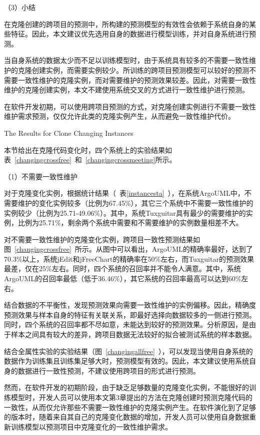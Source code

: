 （3）小结

在克隆创建的跨项目的预测中，所构建的预测模型的有效性会依赖于系统自身的某些特征。因此，本文建议优先选用自身的数据进行模型训练，并对自身系统进行预测。

当自身系统的数据太少而不足以训练模型时，由于系统具有较多的不需要一致性维护的克隆创建实例，而需要实例较少。所训练的跨项目预测模型可以较好的预测不需要一致性维护的克隆实例，而对需要维护的预测效果较差。因此，对需要一致性维护的克隆创建实例，本文不建使用系统交叉的方式进行一致性维护进行预测。

在软件开发初期，可以使用跨项目预测的方式，对克隆创建实例进行不需要一致性维护需求预测，仅仅允许此类的克隆实例产生，从而避免一致性维护代价。

{The Results for Clone Changing Instances}

本节给出在克隆代码变化时，四个系统上的实验结果如表~\ref{changingcrossfree}~和~\ref{changingcrossmeeting}所示。


（1）不需要一致性维护

对于克隆变化实例，根据统计结果（~表\ref{instancesta}~），在系统ArgoUML中，不需要维护的变化实例较多（比例为67.45\%），其它三个系统中不需要一致性维护的实例较少（比例为25.71-49.06\%）。其中，系统Tuxguitar具有最少的需要维护的实例，比例为25.71\%，剩余两个系统中需要和不需要维护的实例数量相差不大。

对不需要一致性维护的克隆变化实例，跨项目一致性预测结果如图~\ref{changingcrossfree}~所示。从图中可以看出，ArgoUML的精确率最好，达到了70.3\%以上，系统jEdit和jFreeChart的精确率在50\%左右，而Tuxguitar的预测效果最差，仅在25\%左右。同时，四个系统的召回率并不能令人满意。其中，系统ArgoUML的召回率最低（低于36.46\%），其它系统的召回率最高可以达到60\%左右。

结合数据的不平衡性，发现预测效果向需要一致性维护的实例偏移。因此，精确度预测效果与样本自身的特征有关联关系，即最好选择向数据较多的一侧进行预测。同时，四个系统的召回率都不尽如意，未能达到较好的预测效果。分析原因，是由于样本之间具有较大的差异，跨项目数据无法较好的拟合被测试系统的样本数据。

结合全属性实验的实验结果（图~\ref{changingallfree}~），可以发现当使用自身系统的数据作为训练集且训练集足够大时，预测模型有效的。因此，本文建议使用系统自身的数据进行一致性预测，不建议使用跨项目的形式进行预测。

然而，在软件开发的初期阶段，由于缺乏足够数量的克隆变化实例，不能很好的训练模型时，开发人员可以使用本文第3章提出的方法在克隆创建时预测克隆代码的一致性，从而仅允许那些不需要一致性维护的克隆实例产生。在软件演化到了足够的版本时，随着来自其自己的克隆变化数据的增加，开发人员可以使用自身数据重新训练模型以预测项目中克隆变化的一致性维护需求。

